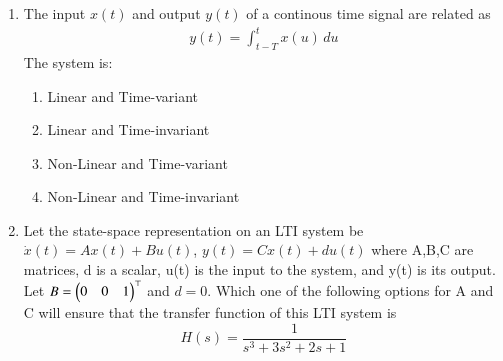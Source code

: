 \begin{enumerate}[label=\arabic*.,ref=\theenumi]
\item The input $x(t)$ and output $y(t)$ of a continous time signal are related as
\begin{align}
    y(t) = \int_{t-T}^tx(u)\,du
\end{align}
The system is:
\begin{enumerate}
    \item Linear and Time-variant
    \item Linear and Time-invariant
    \item Non-Linear and Time-variant
    \item Non-Linear and Time-invariant
\end{enumerate}
\solution



\item Let the state-space representation on an LTI system be $\dot{x}(t) = Ax(t)+Bu(t)$, $y(t)=Cx(t)+du(t)$ where A,B,C are matrices,  d is a scalar, u(t) is the input to the system, and y(t) is its output. Let $B = \begin{pmatrix} 0 & 0 &  1\end{pmatrix}^\top$ and $d = 0$. Which one of the following options for A and C will ensure that the transfer function of this LTI system is 
\begin{equation}
    H(s) = \dfrac{1}{s^3+3s^2+2s+1}
\end{equation}


\end{enumerate}
